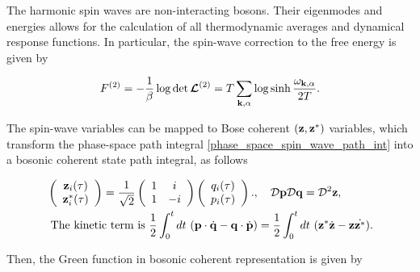 \documentclass{homework}
\begin{document}
The harmonic spin waves are non-interacting bosons. Their eigenmodes and energies allows for the calculation of all thermodynamic averages and dynamical response functions. In particular, the spin-wave correction to the free energy is given by 

\begin{equation}
    F^{(2)} = -\frac{1}{\beta} \log \det \bm{\mathcal{L}}^{(2)} = T \sum_{{\bf k}, \alpha} \log \sinh \frac{\omega_{{\bf k}, \alpha}}{2T}. 
\end{equation}

The spin-wave variables can be mapped to Bose coherent $({\bf z}, {\bf z}^{*})$ variables, which transform the phase-space path integral \cref{phase_space_spin_wave_path_int} into a bosonic coherent state path integral, as follows 

\begin{equation}
\begin{split}
    &\left(\begin{array}{c}
         {\bf z}_{i}(\tau)  \\
         {\bf z}^{*}_{i}(\tau) 
    \end{array}\right) = \frac{1}{\sqrt{2}} \left(\begin{array}{cc}
         1 & i \\
         1 & -i 
    \end{array}\right)
    \left(\begin{array}{c}
         q_{i}(\tau)  \\
         p_{i}(\tau) 
    \end{array}\right)., \quad \mathcal{D}{\bf p}\mathcal{D}{\bf q} = \mathcal{D}^2{\bf z}, \\
    &\textnormal{ The kinetic term is } \frac{1}{2} \int_{0}^{t} dt \textnormal{ } ({\bf p} \cdot \dot{{\bf q}} - {\bf q} \cdot \dot{{\bf p}}) = \frac{1}{2} \int_{0}^{t} dt \textnormal{ } ({\bf z}^{*}\dot{{\bf z}} - {\bf z}\dot{{\bf z}^{*}}).
\end{split}
\end{equation}

Then, the Green function in bosonic coherent representation is given by 
\end{document}
